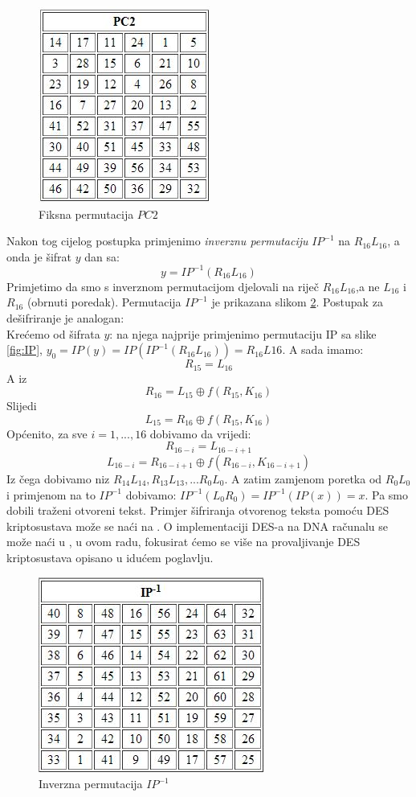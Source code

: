 \documentclass[a4paper,oneside,12pt]{memoir} %
\begin{document}
\begin{spacing}{1.5}
\begin{figure}[h]
\centering \includegraphics[scale=0.8]{PC2.jpg}
\caption{Fiksna permutacija $PC2$}
\label{fig:PC2}
\end{figure}

Nakon tog cijelog postupka primjenimo \textit{inverznu permutaciju} $IP^{-1}$ na $R_{16}L_{16}$, a onda je šifrat $y$ dan sa:
\[y=IP^{-1}(R_{16}L_{16})\]
Primjetimo da smo s inverznom permutacijom djelovali na riječ $R_{16}L_{16}$,a ne $L_{16}$ i $R_{16}$ (obrnuti poredak). Permutacija $IP^{-1}$ je prikazana slikom \ref{fig:invIP}.
Postupak za dešifriranje je analogan:\\
Krećemo od šifrata $y$: na njega najprije primjenimo permutaciju IP sa slike \ref{fig:IP}, $y_0=IP(y)=IP(IP^{-1}(R_{16}L_{16}))=R_{16}L{16}$.  A sada imamo:
\[R_{15}=L_{16}\]
A iz 
\[R_{16}=L_{15} \oplus f(R_{15}, K_{16})\]
Slijedi
\[L_{15}=R_{16} \oplus f(R_{15}, K_{16})\]
Općenito, za sve $i=1,...,16$ dobivamo da vrijedi:
\[R_{16-i}=L_{16-i+1}\]
\[L_{16-i}=R_{16-i+1} \oplus f(R_{16-i}, K_{16-i+1})\]
Iz čega dobivamo niz $R_{14}L_{14},R_{13}L_{13},...R_{0}L_{0}$. A zatim zamjenom poretka od $R_{0}L_{0}$ i primjenom na to $IP^{-1}$ dobivamo:
$IP^{-1}(L_0R_0)=IP^{-1}(IP(x))=x$. 
Pa smo dobili traženi otvoreni tekst. Primjer šifriranja otvorenog teksta pomoću DES kriptosustava može se naći na \cite{DESexa}. O implementaciji DES-a na DNA računalu se može naći u \cite{DESDNA}, u ovom radu, fokusirat ćemo se više na provaljivanje DES kriptosustava opisano u idućem poglavlju.
\begin{figure}[h]
\centering \includegraphics[scale=0.7]{invIP.jpg}
\caption{Inverzna permutacija $IP^{-1}$}
\label{fig:invIP}
\end{figure}


\end{spacing}
\end{document}
